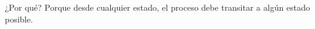 \documentclass[preview]{standalone}
\begin{document}
\begin{center}
¿Por qué? Porque desde cualquier estado, el proceso debe transitar a algún estado posible.
\end{center}
\end{document}

